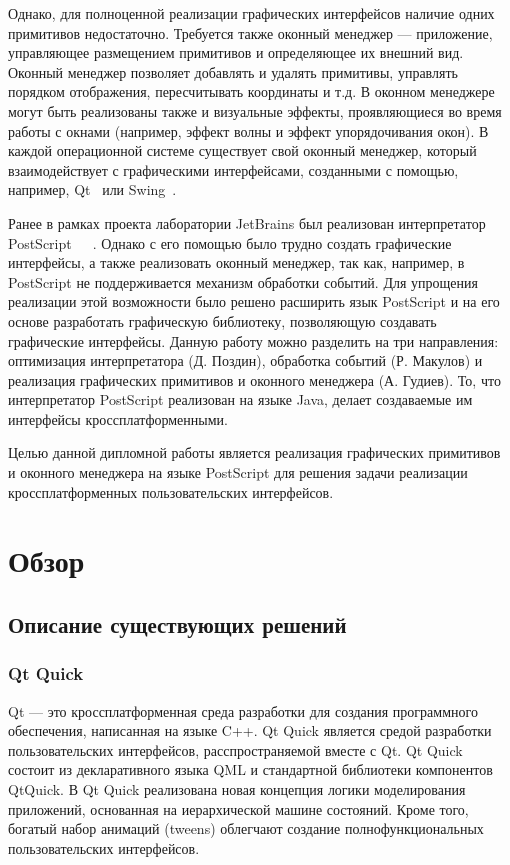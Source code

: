 \documentclass[14pt]{extarticle}
\begin{document}
	Однако, для полноценной реализации графических интерфейсов наличие одних примитивов недостаточно. Требуется также оконный менеджер --- приложение, управляющее размещением примитивов и определяющее их внешний вид. Оконный менеджер позволяет добавлять и удалять примитивы, управлять порядком отображения, пересчитывать координаты и т.д. 
	В оконном менеджере могут быть реализованы также и визуальные эффекты, проявляющиеся во время работы с окнами (например, эффект волны и эффект упорядочивания окон).     
	В каждой операционной системе существует свой оконный менеджер, который взаимодействует с графическими интерфейсами, созданными с помощью, например, Qt~\cite{qtquick} или Swing~\cite{swing}. 
	
	Ранее в рамках проекта лаборатории JetBrains был реализован интерпретатор PostScript~\cite{runtime}~\cite{graphic}~\cite{architecture}. Однако с его помощью было трудно создать графические интерфейсы, а также реализовать оконный менеджер, так как, например, в PostScript не поддерживается механизм обработки событий. Для упрощения реализации этой возможности было решено расширить язык PostScript и на его основе разработать графическую библиотеку, позволяющую создавать графические интерфейсы. Данную работу можно разделить на три направления: оптимизация интерпретатора (Д. Поздин), обработка событий (Р. Макулов) и реализация графических примитивов и оконного менеджера (А. Гудиев). То, что интерпретатор PostScript реализован на языке Java, делает создаваемые им интерфейсы кроссплатформенными.
	
	Целью данной дипломной работы является реализация графических примитивов и оконного менеджера на языке PostScript для решения задачи реализации кроссплатформенных пользовательских интерфейсов.
	
	\pagebreak
	\section{Обзор}
	\subsection{ Описание существующих решений }
		\subsubsection*{Qt Quick}

Qt\cite{qt} --- это кроссплатформенная среда разработки для создания программного обеспечения, написанная на языке C++.  Qt Quick\cite{qtquick} является средой разработки пользовательских интерфейсов, расспространяемой вместе с Qt. Qt Quick состоит из декларативного языка QML и стандартной библиотеки компонентов QtQuick.
В Qt Quick реализована новая концепция логики моделирования приложений, основанная на иерархической машине состояний\cite{qtquick}. Кроме того, богатый набор анимаций (tweens) облегчают создание полнофункциональных пользовательских интерфейсов.
\end{document}
